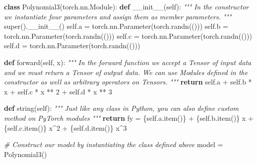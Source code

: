 \documentclass[
]{article}
\newenvironment{Shaded}{}{}
\newcommand{\BuiltInTok}[1]{\textcolor[rgb]{0.00,0.50,0.00}{#1}}
\newcommand{\CommentTok}[1]{\textcolor[rgb]{0.38,0.63,0.69}{\textit{#1}}}
\newcommand{\ControlFlowTok}[1]{\textcolor[rgb]{0.00,0.44,0.13}{\textbf{#1}}}
\newcommand{\DecValTok}[1]{\textcolor[rgb]{0.25,0.63,0.44}{#1}}
\newcommand{\FunctionTok}[1]{\textcolor[rgb]{0.02,0.16,0.49}{#1}}
\newcommand{\KeywordTok}[1]{\textcolor[rgb]{0.00,0.44,0.13}{\textbf{#1}}}
\newcommand{\NormalTok}[1]{#1}
\newcommand{\OperatorTok}[1]{\textcolor[rgb]{0.40,0.40,0.40}{#1}}
\newcommand{\SpecialCharTok}[1]{\textcolor[rgb]{0.25,0.44,0.63}{#1}}
\newcommand{\SpecialStringTok}[1]{\textcolor[rgb]{0.73,0.40,0.53}{#1}}
\newcommand{\VariableTok}[1]{\textcolor[rgb]{0.10,0.09,0.49}{#1}}
\begin{document}
\begin{Shaded}
\begin{Highlighting}[]
\KeywordTok{class}\NormalTok{ Polynomial3(torch.nn.Module):}
    \KeywordTok{def} \FunctionTok{\_\_init\_\_}\NormalTok{(}\VariableTok{self}\NormalTok{):}
        \CommentTok{"""}
\CommentTok{        In the constructor we instantiate four parameters and assign them as}
\CommentTok{        member parameters.}
\CommentTok{        """}
        \BuiltInTok{super}\NormalTok{().}\FunctionTok{\_\_init\_\_}\NormalTok{()}
        \VariableTok{self}\NormalTok{.a }\OperatorTok{=}\NormalTok{ torch.nn.Parameter(torch.randn(()))}
        \VariableTok{self}\NormalTok{.b }\OperatorTok{=}\NormalTok{ torch.nn.Parameter(torch.randn(()))}
        \VariableTok{self}\NormalTok{.c }\OperatorTok{=}\NormalTok{ torch.nn.Parameter(torch.randn(()))}
        \VariableTok{self}\NormalTok{.d }\OperatorTok{=}\NormalTok{ torch.nn.Parameter(torch.randn(()))}

    \KeywordTok{def}\NormalTok{ forward(}\VariableTok{self}\NormalTok{, x):}
        \CommentTok{"""}
\CommentTok{        In the forward function we accept a Tensor of input data and we must return}
\CommentTok{        a Tensor of output data. We can use Modules defined in the constructor as}
\CommentTok{        well as arbitrary operators on Tensors.}
\CommentTok{        """}
        \ControlFlowTok{return} \VariableTok{self}\NormalTok{.a }\OperatorTok{+} \VariableTok{self}\NormalTok{.b }\OperatorTok{*}\NormalTok{ x }\OperatorTok{+} \VariableTok{self}\NormalTok{.c }\OperatorTok{*}\NormalTok{ x }\OperatorTok{**} \DecValTok{2} \OperatorTok{+} \VariableTok{self}\NormalTok{.d }\OperatorTok{*}\NormalTok{ x }\OperatorTok{**} \DecValTok{3}

    \KeywordTok{def}\NormalTok{ string(}\VariableTok{self}\NormalTok{):}
        \CommentTok{"""}
\CommentTok{        Just like any class in Python, you can also define custom method on PyTorch modules}
\CommentTok{        """}
        \ControlFlowTok{return} \SpecialStringTok{f\textquotesingle{}y = }\SpecialCharTok{\{}\VariableTok{self}\SpecialCharTok{.}\NormalTok{a}\SpecialCharTok{.}\NormalTok{item()}\SpecialCharTok{\}}\SpecialStringTok{ + }\SpecialCharTok{\{}\VariableTok{self}\SpecialCharTok{.}\NormalTok{b}\SpecialCharTok{.}\NormalTok{item()}\SpecialCharTok{\}}\SpecialStringTok{ x + }\SpecialCharTok{\{}\VariableTok{self}\SpecialCharTok{.}\NormalTok{c}\SpecialCharTok{.}\NormalTok{item()}\SpecialCharTok{\}}\SpecialStringTok{ x\^{}2 + }\SpecialCharTok{\{}\VariableTok{self}\SpecialCharTok{.}\NormalTok{d}\SpecialCharTok{.}\NormalTok{item()}\SpecialCharTok{\}}\SpecialStringTok{ x\^{}3\textquotesingle{}}

\CommentTok{\# Construct our model by instantiating the class defined above}
\NormalTok{model }\OperatorTok{=}\NormalTok{ Polynomial3()}
\end{Highlighting}
\end{Shaded}
\end{document}

